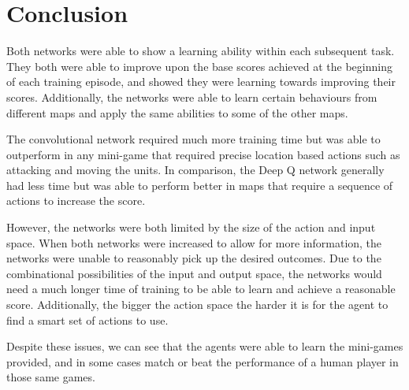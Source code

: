 \section{Conclusion}

Both networks were able to show a learning ability within each subsequent task.
They both were able to improve upon the base scores achieved at the beginning of
each training episode, and showed they were learning towards improving their
scores. Additionally, the networks were able to learn certain behaviours from
different maps and apply the same abilities to some of the other maps.

The convolutional network required much more training time but was able to
outperform in any mini-game that required precise location based actions such as
attacking and moving the units. In comparison, the Deep Q network generally had
less time but was able to perform better in maps that require a sequence of
actions to increase the score.

However, the networks were both limited by the size of the action and input
space. When both networks were increased to allow for more information, the
networks were unable to reasonably pick up the desired outcomes. Due to the
combinational possibilities of the input and output space, the networks would
need a much longer time of training to be able to learn and achieve a reasonable
score. Additionally, the bigger the action space the harder it is for the agent
to find a smart set of actions to use.

Despite these issues, we can see that the agents were able to learn the
mini-games provided, and in some cases match or beat the performance of a human
player in those same games.
